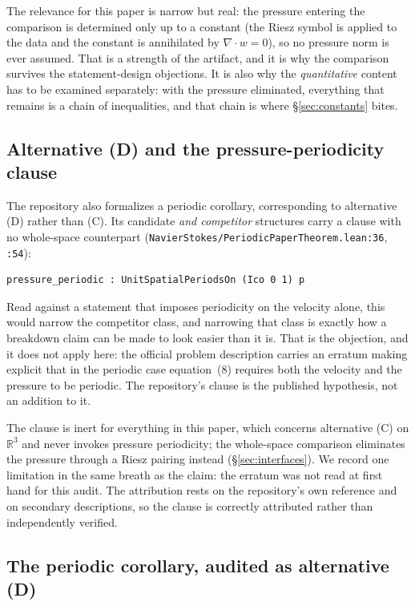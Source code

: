 \documentclass[11pt]{article}
\newcommand{\R}{\mathbb{R}}
\newcommand{\file}[1]{\texttt{\small #1}}
\theoremstyle{plain}
\theoremstyle{definition}
\theoremstyle{remark}
\begin{document}
The relevance for this paper is narrow but real: the pressure entering the
comparison is determined only up to a constant (the Riesz symbol is applied to
the data and the constant is annihilated by $\nabla\cdot w=0$), so no pressure
norm is ever assumed. That is a strength of the artifact, and it is why the
comparison survives the statement-design objections. It is also why the
\emph{quantitative} content has to be examined separately: with the pressure
eliminated, everything that remains is a chain of inequalities, and that chain
is where \S\ref{sec:constants} bites.

\subsection{Alternative (D) and the pressure-periodicity clause}
\label{sec:pressure-periodic}

The repository also formalizes a periodic corollary, corresponding to
alternative (D) rather than (C). Its candidate \emph{and competitor} structures
carry a clause with no whole-space counterpart
(\file{NavierStokes/PeriodicPaperTheorem.lean:36}, \file{:54}):
\begin{lstlisting}
pressure_periodic : UnitSpatialPeriodsOn (Ico 0 1) p
\end{lstlisting}
Read against a statement that imposes periodicity on the velocity alone, this
would narrow the competitor class, and narrowing that class is exactly how a
breakdown claim can be made to look easier than it is. That is the objection,
and it does not apply here: the official problem description carries an erratum
making explicit that in the periodic case equation~(8) requires both the
velocity and the pressure to be periodic. The repository's clause is the
published hypothesis, not an addition to it.

The clause is inert for everything in this paper, which concerns alternative
(C) on $\R^3$ and never invokes pressure periodicity; the whole-space
comparison eliminates the pressure through a Riesz pairing instead
(\S\ref{sec:interfaces}). We record one limitation in the same breath as the
claim: the erratum was not read at first hand for this audit. The attribution
rests on the repository's own reference and on secondary descriptions, so the
clause is correctly attributed rather than independently verified.

\subsection{The periodic corollary, audited as alternative (D)}
\label{sec:periodic}
\end{document}
